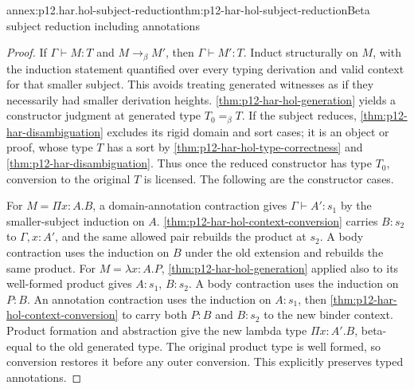 \begin{annexitem}{annex:p12.har.hol-subject-reduction}{thm:p12-har-hol-subject-reduction}{Beta subject reduction including annotations}
\begin{proof}
If \(\Gamma\vdash M:T\) and \(M\longrightarrow_\beta M'\), then
\(\Gamma\vdash M':T\). Induct structurally on \(M\), with the induction
statement quantified over every typing derivation and valid context for
that smaller subject. This avoids treating generated witnesses as if
they necessarily had smaller derivation heights. \cref{thm:p12-har-hol-generation} yields a constructor
judgment at generated type \(T_0=_\beta T\).
If the subject reduces, \cref{thm:p12-har-disambiguation} excludes its rigid domain and sort cases;
it is an object or proof, whose type \(T\) has a sort by \cref{thm:p12-har-hol-type-correctness} and \cref{thm:p12-har-disambiguation}.
Thus once the reduced constructor has type \(T_0\), conversion to
the original \(T\) is licensed. The following are the constructor cases.

For \(M=\Pi x:A.B\), a domain-annotation contraction gives
\(\Gamma\vdash A':s_1\) by the smaller-subject induction on \(A\).
\cref{thm:p12-har-hol-context-conversion} carries \(B:s_2\) to \(\Gamma,x:A'\), and the same allowed pair
rebuilds the product at \(s_2\). A body contraction uses the induction
on \(B\) under the old extension and rebuilds the same product.
For \(M=\lambda x:A.P\), \cref{thm:p12-har-hol-generation} applied also to its well-formed product
gives \(A:s_1\), \(B:s_2\). A body contraction uses the induction
on \(P:B\). An annotation contraction uses the induction on
\(A:s_1\), then \cref{thm:p12-har-hol-context-conversion} to carry both \(P:B\) and \(B:s_2\) to the
new binder context. Product formation and abstraction give the new
lambda type \(\Pi x:A'.B\), beta-equal to the old generated type.
The original product type is well formed, so conversion restores it
before any outer conversion. This explicitly preserves typed annotations.


\end{proof}
\end{annexitem}
